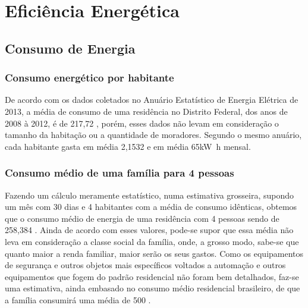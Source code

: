 \chapter{Eficiência Energética}


\section{Consumo de Energia}

\subsection{Consumo energético por habitante}

	De acordo com os dados coletados no Anuário Estatístico de Energia Elétrica de 2013, a média de consumo de uma residência no Distrito Federal, dos anos de 2008 à 2012, é de 217,72 , porém, esses dados não levam em consideração o tamanho da habitação ou a quantidade de moradores. Segundo o mesmo anuário, cada habitante gasta em média 2,1532  e em média 65\si{\kilo\watt\hour} mensal\cite{2013Aneel}.

\subsection{Consumo médio de uma família para 4 pessoas}

	Fazendo um cálculo meramente estatístico, numa estimativa grosseira, supondo um mês com 30 dias e 4 habitantes com a média de consumo idênticas, obtemos que o consumo médio de energia de uma residência com 4 pessoas sendo de 258,384 . Ainda de acordo com esses valores, pode-se supor que essa média não leva em consideração a classe social da família, onde, a grosso modo, sabe-se que quanto maior a renda familiar, maior serão os seus gastos. Como os equipamentos de segurança e outros objetos mais específicos voltados a automação e outros equipamentos que fogem do padrão residencial não foram bem detalhados, faz-se uma estimativa, ainda embasado no consumo médio residencial brasileiro, de que a família consumirá uma média de 500 .

